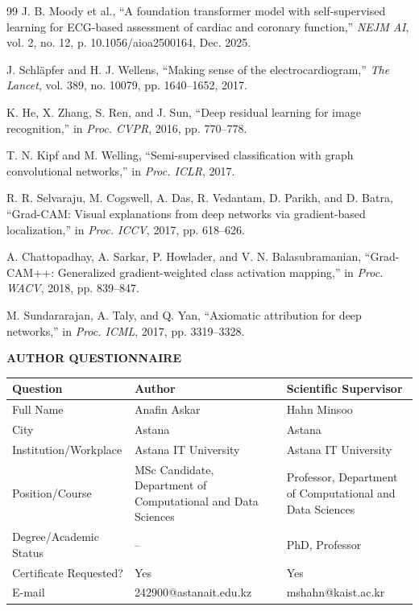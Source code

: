 \documentclass[14pt]{extarticle}
\begin{document}
\begin{thebibliography}{99}
J. B. Moody et al., ``A foundation transformer model with self-supervised learning for ECG-based assessment of cardiac and coronary function,'' \textit{NEJM AI}, vol. 2, no. 12, p. 10.1056/aioa2500164, Dec. 2025.

J. Schl\"{a}pfer and H. J. Wellens, ``Making sense of the electrocardiogram,'' \textit{The Lancet}, vol. 389, no. 10079, pp. 1640--1652, 2017.

K. He, X. Zhang, S. Ren, and J. Sun, ``Deep residual learning for image recognition,'' in \textit{Proc. CVPR}, 2016, pp. 770--778.

T. N. Kipf and M. Welling, ``Semi-supervised classification with graph convolutional networks,'' in \textit{Proc. ICLR}, 2017.

R. R. Selvaraju, M. Cogswell, A. Das, R. Vedantam, D. Parikh, and D. Batra, ``Grad-CAM: Visual explanations from deep networks via gradient-based localization,'' in \textit{Proc. ICCV}, 2017, pp. 618--626.

A. Chattopadhay, A. Sarkar, P. Howlader, and V. N. Balasubramanian, ``Grad-CAM++: Generalized gradient-weighted class activation mapping,'' in \textit{Proc. WACV}, 2018, pp. 839--847.

M. Sundararajan, A. Taly, and Q. Yan, ``Axiomatic attribution for deep networks,'' in \textit{Proc. ICML}, 2017, pp. 3319--3328.

\end{thebibliography}


\newpage
\begin{center}
\bfseries\large
AUTHOR QUESTIONNAIRE
\end{center}
\vspace{1em}
\begin{table}[H]
\centering
\small
\begin{tabular}{|l|p{5.5cm}|p{5.5cm}|}
\hline
\textbf{Question} & \textbf{Author} & \textbf{Scientific Supervisor} \\
\hline
Full Name & Anafin Askar & Hahn Minsoo \\
\hline
City & Astana & Astana \\
\hline
Institution/Workplace & Astana IT University & Astana IT University \\
\hline
Position/Course & MSc Candidate, Department of Computational and Data Sciences & Professor, Department of Computational and Data Sciences \\
\hline
Degree/Academic Status & -- & PhD, Professor \\
\hline
Certificate Requested? & Yes & Yes \\
\hline
E-mail & 242900@astanait.edu.kz & mshahn@kaist.ac.kr \\
\hline
\end{tabular}
\end{table}
\end{document}
